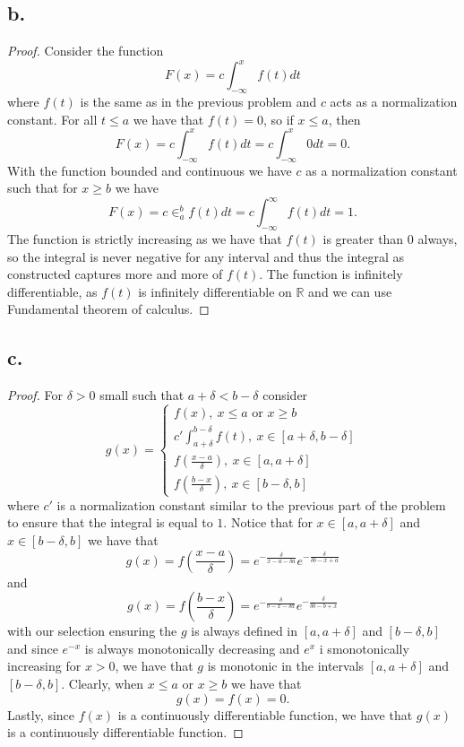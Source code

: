 \documentclass{article}
\begin{document}
\subsection*{b.}
\begin{proof}
    Consider the function 
    \[
    F(x) = c \int_{-\infty}^x f(t) dt    
    \]
    where $f(t)$ is the same as in the previous problem and $c$ acts as a normalization constant. For all $t \leq a$ we have that $f(t) = 0$, so if $x \leq a$, then 
    \[
    F(x) = c \int_{-\infty}^x f(t) dt = c \int_{-\infty}^x 0dt = 0.     
    \]
    With the function bounded and continuous we have $c$ as a normalization constant such that for $x \geq b$ we have 
    \[
    F(x) = c \in_{a}^b f(t)dt = c \int_{-\infty}^{\infty} f(t) dt = 1.    
    \]
    The function is strictly increasing as we have that $f(t)$ is greater than $0$ always, so the integral is never negative for any interval and thus the integral as constructed captures more and more of $f(t)$. The function is infinitely differentiable, as $f(t)$ is infinitely differentiable on $\mathbb{R}$ and we can use Fundamental theorem of calculus.  
\end{proof}
\subsection*{c.}
\begin{proof}
   For $\delta > 0$ small such that $a+ \delta < b - \delta$ consider 
   \[
   g(x) = \begin{cases}
    f(x), \ x \leq a \text{ or } x \geq b \\
    c' \int_{a + \delta}^{b - \delta} f(t),  \ x \in [a + \delta, b - \delta] \\
    f \left( \frac{x - a}{\delta}\right),  \ x \in [a, a + \delta] \\
    f\left(\frac{b - x}{\delta} \right) , \  x \in [b - \delta, b]
   \end{cases} 
   \] 
   where $c'$ is a normalization constant similar to the previous part of the problem to ensure that the integral is equal to $1$. Notice that for $x \in [a, a + \delta]$ and $x \in [b - \delta, b]$ we have that 
   \[
   g(x) = f \left(\frac{x - a}{\delta} \right) = e^{- \frac{\delta}{x - a - \delta a}} e^{ - \frac{\delta}{\delta b - x + a}}
   \]
   and
   \[
   g(x) = f \left( \frac{b - x}{\delta} \right) = e^{- \frac{\delta}{b - x - \delta a}}e^{- \frac{\delta}{\delta b - b + x}} 
   \]
   with our selection ensuring the $g$ is always defined in $[a, a + \delta]$ and $[b - \delta, b]$ and since $e^{-x}$ is always monotonically decreasing and $e^x$ i smonotonically increasing for $x > 0$, we have that $g$ is monotonic in the intervals $[a , a + \delta]$ and $[b - \delta, b]$. Clearly, when $x \leq a$ or $x \geq b$ we have that 
   \[
   g(x) = f(x) = 0.  
   \]
   Lastly, since $f(x)$ is a continuously differentiable function, we have that $g(x)$ is a continuously differentiable function. 
\end{proof}
\end{document}
